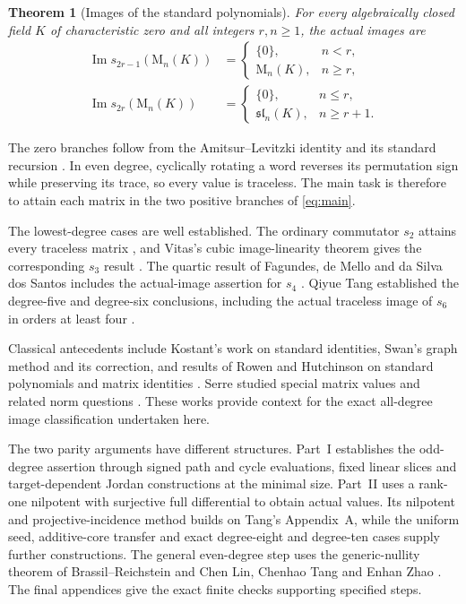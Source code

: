 \documentclass[11pt]{amsart}
\newtheorem{theorem}{Theorem}[section]
\newcommand{\Mat}{\mathrm{M}}
\newcommand{\im}{\operatorname{Im}}
\newcommand{\Sl}{\mathfrak{sl}}
\begin{document}
\begin{theorem}[Images of the standard polynomials]\label{thm:main}
For every algebraically closed field $K$ of characteristic zero and all
integers $r,n\ge1$, the \emph{actual images} are
\begin{equation}\label{eq:main}
\begin{aligned}
 \im s_{2r-1}(\Mat_n(K))
 &=\begin{cases}\{0\},&n<r,\\ \Mat_n(K),&n\ge r,\end{cases}\\[3pt]
 \im s_{2r}(\Mat_n(K))
 &=\begin{cases}\{0\},&n\le r,\\ \Sl_n(K),&n\ge r+1.\end{cases}
\end{aligned}
\end{equation}
\end{theorem}

The zero branches follow from the Amitsur--Levitzki identity and
its standard recursion \cite{AmitsurLevitzki1950}. In even degree,
cyclically rotating a word reverses its permutation sign while
preserving its trace, so every value is traceless. The main task is
therefore to attain each matrix in the two positive branches of
\eqref{eq:main}.

The lowest-degree cases are well established. The ordinary commutator
$s_2$ attains every traceless matrix \cite{AlbertMuckenhoupt1957},
and Vitas's cubic image-linearity theorem gives the corresponding
$s_3$ result \cite{Vitas2026}. The quartic result of Fagundes,
de Mello and da Silva dos Santos includes the actual-image assertion
for $s_4$ \cite[Theorem~8, Case~1]{FagundesMelloSantos2022}.
Qiyue Tang established the degree-five and degree-six conclusions,
including the actual traceless image of $s_6$ in orders at least four
\cite[Appendix~A, Proposition~11]{Tang2026FiveSix}.

Classical antecedents include Kostant's work on standard identities,
Swan's graph method and its correction, and results of Rowen and
Hutchinson on standard polynomials and matrix identities
\cite{Kostant1958,Swan1963,Swan1969Correction,Rowen1974,Hutchinson1974}.
Serre studied special matrix values and related norm questions
\cite{Serre2016}. These works provide context for the exact
all-degree image classification undertaken here.

The two parity arguments have different structures. Part~I establishes
the odd-degree assertion through signed path and cycle evaluations,
fixed linear slices and target-dependent Jordan constructions at the
minimal size. Part~II uses a rank-one nilpotent with surjective full
differential to obtain actual values. Its nilpotent and
projective-incidence method builds on Tang's Appendix~A, while the
uniform seed, additive-core transfer and exact degree-eight and
degree-ten cases supply further constructions. The general even-degree
step uses the generic-nullity theorem of Brassil--Reichstein
\cite[Theorem~1.2]{BrassilReichstein2022} and Chen Lin, Chenhao Tang
and Enhan Zhao \cite[Theorem~1.2]{LinTangZhao2026}. The final
appendices give the exact finite checks supporting specified steps.
\end{document}
